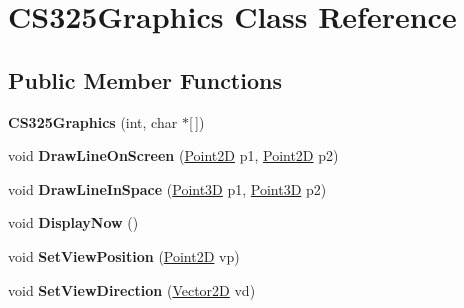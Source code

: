 \hypertarget{class_c_s325_graphics}{
\section{CS325Graphics Class Reference}
\label{class_c_s325_graphics}
}
\subsection*{Public Member Functions}
\begin{DoxyCompactItemize}
\item 
\hypertarget{class_c_s325_graphics_a6f85502405f075faafae55dbe3271524}{
{\bfseries CS325Graphics} (int, char $\ast$\mbox{[}$\,$\mbox{]})}
\label{class_c_s325_graphics_a6f85502405f075faafae55dbe3271524}

\item 
\hypertarget{class_c_s325_graphics_a50bef85ed0e65160e4035f8333737269}{
void {\bfseries DrawLineOnScreen} (\hyperlink{class_point2_d}{Point2D} p1, \hyperlink{class_point2_d}{Point2D} p2)}
\label{class_c_s325_graphics_a50bef85ed0e65160e4035f8333737269}

\item 
\hypertarget{class_c_s325_graphics_a6d50fae71655d3ae1447a5cab911057a}{
void {\bfseries DrawLineInSpace} (\hyperlink{class_point3_d}{Point3D} p1, \hyperlink{class_point3_d}{Point3D} p2)}
\label{class_c_s325_graphics_a6d50fae71655d3ae1447a5cab911057a}

\item 
\hypertarget{class_c_s325_graphics_a6e675e1c68c76bd09fcb4437057a2ca6}{
void {\bfseries DisplayNow} ()}
\label{class_c_s325_graphics_a6e675e1c68c76bd09fcb4437057a2ca6}

\item 
\hypertarget{class_c_s325_graphics_a87ce4123a68fb75d29e72dd236f5aab7}{
void {\bfseries SetViewPosition} (\hyperlink{class_point2_d}{Point2D} vp)}
\label{class_c_s325_graphics_a87ce4123a68fb75d29e72dd236f5aab7}

\item 
\hypertarget{class_c_s325_graphics_a317b9241e6bee5575b5d2914b40f6de3}{
void {\bfseries SetViewDirection} (\hyperlink{class_vector2_d}{Vector2D} vd)}
\label{class_c_s325_graphics_a317b9241e6bee5575b5d2914b40f6de3}

\end{DoxyCompactItemize}
